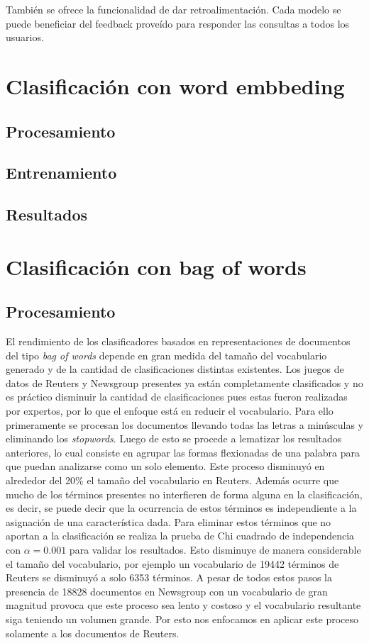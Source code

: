 \documentclass[12pt]{llncs}
\begin{document}
También se ofrece la funcionalidad de dar retroalimentación. Cada modelo se puede beneficiar del feedback proveído para responder las consultas a todos los usuarios.

\section{Clasificación con word embbeding}

\subsection {Procesamiento}

\subsection {Entrenamiento}

\subsection {Resultados}

\section {Clasificación con bag of words}

\subsection {Procesamiento}
\par El rendimiento de los clasificadores basados en representaciones de documentos del tipo \emph{bag of words} depende en gran medida del tamaño del vocabulario generado y de la cantidad de clasificaciones distintas existentes. Los juegos de datos de Reuters y Newsgroup presentes ya están completamente clasificados y no es práctico disminuir la cantidad de clasificaciones pues estas fueron realizadas por expertos, por lo que el enfoque está en reducir el vocabulario. Para ello primeramente se procesan los documentos llevando todas las letras a minúsculas y eliminando los \emph{stopwords}. Luego de esto se procede a lematizar los resultados anteriores, lo cual consiste en agrupar las formas flexionadas de una palabra para que puedan analizarse como un solo elemento. Este proceso disminuyó en alrededor del 20\% el tamaño del vocabulario en Reuters. Además ocurre que mucho de los términos presentes no interfieren de forma alguna en la clasificación, es decir, se puede decir que la ocurrencia de estos términos es independiente a la asignación de una característica dada. Para eliminar estos términos que no aportan a la clasificación se realiza la prueba de Chi cuadrado de independencia con $\alpha = 0.001$ para validar los resultados. Esto disminuye de manera considerable el tamaño del vocabulario, por ejemplo un vocabulario de 19442 términos de Reuters se disminuyó a solo 6353 términos. A pesar de todos estos pasos la presencia de 18828 documentos en Newsgroup con un vocabulario de gran magnitud provoca que este proceso sea lento y costoso y el vocabulario resultante siga teniendo un volumen grande. Por esto nos enfocamos en aplicar este proceso solamente a los documentos de Reuters.
\end{document}
